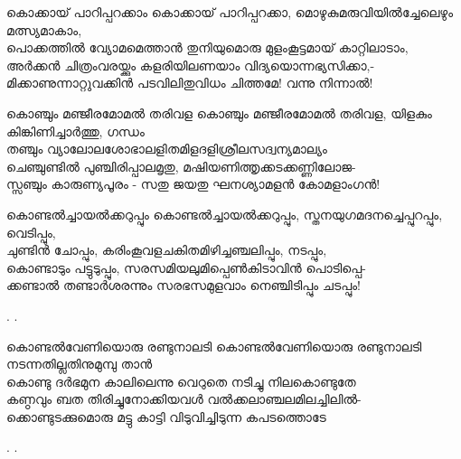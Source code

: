 \begin{enumerate}

\begin{slokam}{\VSr}{\HM}{കൊക്കായ് പാറിപ്പറക്കാം}
കൊക്കായ് പാറിപ്പറക്കാ, മൊഴുകുമരുവിയിൽച്ചേലെഴും മത്സ്യമാകാം,\\
പൊക്കത്തിൽ വ്യോമമെത്താൻ തുനിയുമൊരു മുളംകൂട്ടമായ് കാറ്റിലാടാം,\\
അർക്കൻ ചിത്രംവരയ്ക്കും കളരിയിലണയാം വിദ്യയൊന്നഭ്യസിക്കാ,-\\
മിക്കാണുന്നാറ്റുവക്കിൻ പടവിലിതുവിധം ചിത്തമേ! വന്നു നിന്നാൽ!
\end{slokam}


\begin{slokam}{\VSr}{\KND}{കൊഞ്ചും മഞ്ജീരമോമൽ തരിവള}
കൊഞ്ചും മഞ്ജീരമോമൽ തരിവള, യിളകും കിങ്കിണിച്ചാർത്തു, ഗന്ധം\\
തഞ്ചും വ്യാലോലശോഭാലളിതമിളദളിശ്രീലസദ്വന്യമാല്യം\\
ചെഞ്ചുണ്ടിൽ പുഞ്ചിരിപ്പാലമൃതു, മഷിയണിത്തൃക്കടക്കണ്ണിലോജ-\\
സ്സഞ്ചും കാരുണ്യപൂരം - സതു ജയതു ഘനശ്യാമളൻ കോമളാംഗൻ!
\end{slokam}





\begin{slokam}{\VSr}{\VKG}{കൊണ്ടൽച്ചായൽക്കറുപ്പും}
 കൊണ്ടൽച്ചായൽക്കറുപ്പും, സ്തനയുഗമദനച്ചെപ്പുറപ്പും, വെടിപ്പും,\\
ചുണ്ടിൻ ചോപ്പും, കരിംകൂവളചകിതമിഴിച്ചഞ്ചലിപ്പും, നടപ്പും,\\
കൊണ്ടാടും പട്ടുടുപ്പും, സരസമിയലുമിപ്പെൺകിടാവിൻ പൊടിപ്പെ-\\
ക്കണ്ടാൽ തണ്ടാർശരന്നും സരഭസമുളവാം നെഞ്ചിടിപ്പും ചടപ്പും!
\end{slokam}


.  .


\begin{slokam}{\VKm}{\ARRV}{കൊണ്ടല്‍വേണിയൊരു രണ്ടുനാലടി}
 കൊണ്ടല്‍വേണിയൊരു രണ്ടുനാലടി നടന്നതില്ലതിനുമുമ്പു താന്‍\\
കൊണ്ടു ദര്‍ഭമുന കാലിലെന്നു വെറുതെ നടിച്ചു നിലകൊണ്ടുതേ\\
കണ്ഠവും ബത തിരിച്ചുനോക്കിയവള്‍ വല്‍ക്കലാഞ്ചലമിലച്ചിലില്‍-\\
ക്കൊണ്ടുടക്കുമൊരു മട്ടു കാട്ടി വിടുവിച്ചിടുന്ന കപടത്തൊടേ
\end{slokam}


.
.



\end{enumerate}
